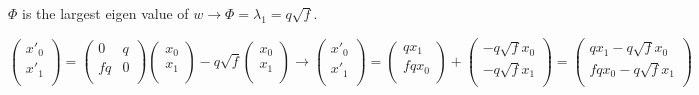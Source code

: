 $\varPhi$ is the largest eigen value of $w \rightarrow \varPhi = \lambda_1 = q\sqrt{f}.$

\[ \begin{pmatrix}
       x'_0 \\[0.3em]
       x'_1 \\[0.3em]
     \end{pmatrix}  = \begin{pmatrix}
            0 & q \\[0.3em]
            fq & 0 \\[0.3em]
          \end{pmatrix}\begin{pmatrix}
                 x_0 \\[0.3em]
                 x_1 \\[0.3em]
               \end{pmatrix} - q\sqrt{f}\begin{pmatrix}
                      x_0 \\[0.3em]
                      x_1 \\[0.3em]
                    \end{pmatrix} \rightarrow \begin{pmatrix}
                           x'_0 \\[0.3em]
                           x'_1 \\[0.3em]
                         \end{pmatrix}  = \begin{pmatrix}
                                qx_1\\[0.3em]
                                fqx_0\\[0.3em]
                              \end{pmatrix} + \begin{pmatrix}
                                     -q\sqrt{f}x_0 \\[0.3em]
                                     -q\sqrt{f}x_1 \\[0.3em]
                                   \end{pmatrix} = 
                                   \begin{pmatrix}
                                    qx_1 -q\sqrt{f}x_0 \\[0.3em]
                                    fqx_0 -q\sqrt{f}x_1 \\[0.3em]
                                     \end{pmatrix}
                                   \] 

